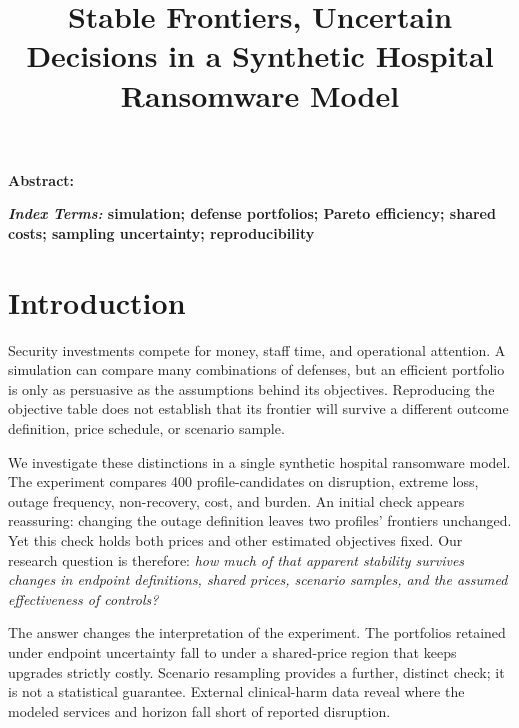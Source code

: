 \documentclass[conference,compsoc]{IEEEtran}
\newif\ifanonymous
\renewenvironment{abstract}{\par\noindent\small\bfseries Abstract: }{\par\normalfont\normalsize}
\renewenvironment{IEEEkeywords}{\par\noindent\small\bfseries\textit{Index Terms: }}{\par\normalfont\normalsize}
\begin{document}
\title{Stable Frontiers, Uncertain Decisions in a Synthetic Hospital Ransomware Model}
\ifanonymous
\author{Anonymous authors}
\else
\author{
}
\fi
\maketitle
\begin{abstract}

\end{abstract}
\begin{IEEEkeywords}
simulation; defense portfolios; Pareto efficiency;
shared costs; sampling uncertainty; reproducibility
\end{IEEEkeywords}



\section{Introduction}
Security investments compete for money, staff time, and operational attention.
A simulation can compare many combinations of defenses, but an efficient
portfolio is only as persuasive as the assumptions behind its objectives.
Reproducing the objective table does not establish that its frontier will
survive a different outcome definition, price schedule, or scenario sample.

We investigate these distinctions in a single synthetic hospital ransomware
model. The experiment compares 400 profile-candidates on disruption, extreme
loss, outage frequency, non-recovery, cost, and burden. An initial check
appears reassuring: changing the outage definition leaves two profiles'
frontiers unchanged. Yet this check holds both prices and other estimated
objectives fixed. Our research question is therefore: \emph{how much of
that apparent stability survives changes in endpoint definitions, shared
prices, scenario samples, and the assumed effectiveness of controls?}

The answer changes the interpretation of the experiment. The
\CertGuaranteedTotal{} portfolios retained under endpoint uncertainty fall to
\JointRetainedFloored{} under a shared-price region that keeps upgrades
strictly costly. Scenario resampling provides a further, distinct check;
it is not a statistical guarantee. External clinical-harm data reveal where
the modeled services and horizon fall short of reported disruption.
\end{document}
